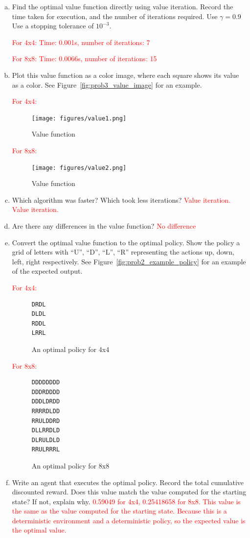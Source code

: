 \documentclass[12pt]{article}
\newcommand{\yl}[1]{\textcolor{red}{#1}}
\begin{document}
\begin{enumerate}[a)]
  
\item Find the optimal value function directly using value
  iteration. Record the time taken for execution, and the number of
  iterations required. Use $\gamma=0.9$ Use a stopping tolerance of
  $10^{-3}$.  
  
  \yl{For 4x4: 
  Time: 0.001s, number of iterations: 7}
  
    \yl{For 8x8: 
  Time: 0.0066s, number of iterations: 15}
\item Plot this value function as a color image, where each square
  shows its value as a color. See Figure~\ref{fig:prob3_value_image}
  for an example.
  
  \yl{For 4x4:}
  
  \begin{figure}[H]
  \centering
  \texttt{[image: figures/value1.png]}
  \caption{Value function}
\end{figure}

  \yl{For 8x8:}
  
  \begin{figure}[H]
  \centering
  \texttt{[image: figures/value2.png]}
  \caption{Value function}
\end{figure}
  
\item Which algorithm was faster? Which took less iterations? \yl{Value iteration. Value iteration.}
\item Are there any differences in the value function? \yl{No difference}
\item Convert the optimal value function to the optimal policy. Show
  the policy a grid of letters with ``U'', ``D'', ``L'', ``R''
  representing the actions up, down, left, right respectively. See
  Figure~\ref{fig:prob2_example_policy} for an example of the expected
  output.
  
    \yl{For 4x4:}
  \begin{figure}[H]
  \centering
  \begin{BVerbatim}
DRDL
DLDL
RDDL
LRRL
  \end{BVerbatim}
  \caption{An optimal policy for 4x4}
\end{figure}

  \yl{For 8x8:}
  \begin{figure}[H]
  \centering
  \begin{BVerbatim}
DDDDDDDD
DDDRDDDD
DDDLDRDD
RRRRDLDD
RRULDDRD
DLLRRDLD
DLRULDLD
RRULRRRL
  \end{BVerbatim}
  \caption{An optimal policy for 8x8}
\end{figure}\item Write an agent that executes the optimal policy. Record the
  total cumulative discounted reward. Does this value match the value
  computed for the starting state? If not, explain why. \yl{0.59049 for 4x4, 0.25418658 for 8x8. This value is the same as the value computed for the starting state. Because this is a deterministic environment and a deterministic policy, so the expected value is the optimal value.}
\end{enumerate}
\end{document}
